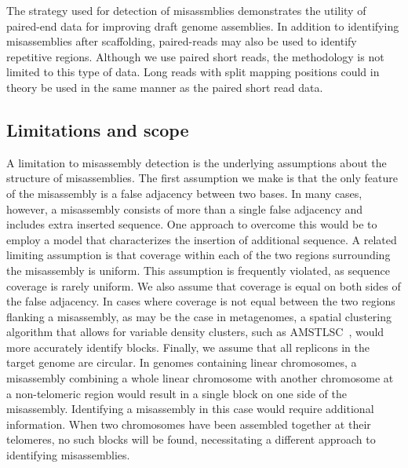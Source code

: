 \documentclass[10pt]{article}
\begin{document}
The strategy used for detection of misassmblies demonstrates the utility of paired-end data for improving draft genome assemblies.
In addition to identifying misassemblies after scaffolding, paired-reads may also be used to identify repetitive regions.   
Although we use paired short reads, the methodology is not limited to this type of data. Long reads with split mapping positions 
could in theory be used in the same manner as the paired short read data.

\subsection*{Limitations and scope}

A limitation to misassembly detection is the underlying assumptions about the structure of misassemblies. The first assumption we make
is that the only feature of the misassembly is a false adjacency between two bases.
In many cases, however, a misassembly consists of more than a single false adjacency and includes extra inserted sequence.  One approach to
overcome this would be to employ a model that characterizes the insertion of additional sequence. A related limiting assumption is 
that coverage within each of the two regions surrounding the misassembly is uniform. This assumption is frequently violated, as sequence coverage
is rarely uniform. We also assume that coverage is equal on both sides of the false adjacency. In cases where coverage is not equal between 
the two regions flanking a misassembly, as may be the case in metagenomes, a spatial clustering algorithm that allows for variable density
clusters, such as AMSTLSC~\cite{AMSTLSC}, would more accurately identify blocks. Finally, we assume that all replicons in the target genome
are circular. In genomes containing linear chromosomes, a misassembly combining a whole linear chromosome with another chromosome
at a non-telomeric region would result in a single block on one side of the misassembly. Identifying a misassembly in this case
would require additional information. When two chromosomes have been assembled together at their telomeres, no such blocks will be found, 
necessitating a different approach to identifying misassemblies.
\end{document}
